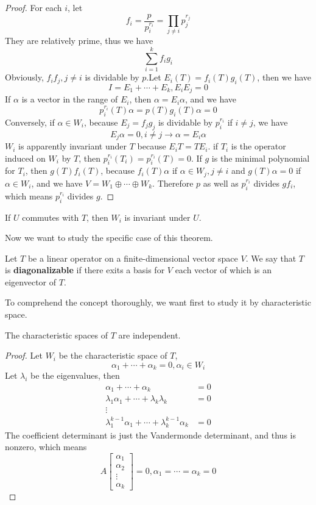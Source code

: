 \documentclass{article}
\begin{document}
\begin{proof}
	For each $i$, let
	\[f_i=\frac{p}{p_i^{r_i}}=\prod_{j\neq i}p_{j}^{r_j}\]
	They are relatively prime, thus we have
	\[\sum\limits_{i=1}^kf_ig_i\]
	Obviously, $f_if_j,j\neq i$ is dividable by $p$.Let $E_i(T)=f_i(T)g_i(T)$, then we have
	\[I=E_1+\cdots+E_k,E_iE_j=0\]
	If $\alpha$ is a vector in the range of $E_i$, then $\alpha=E_i\alpha$, and we have
	\[p_i^{r_i}(T)\alpha=p(T)g_i(T)\alpha=0\]
	Conversely, if $\alpha\in W_i$, because $E_j=f_jg_j$ is dividable by $p_i^{r_i}$ if $i\neq j$, we have
	\[E_j\alpha=0,i\neq j\rightarrow\alpha=E_i\alpha\]
	$W_i$ is apparently invariant under $T$ because $E_iT=TE_i$. if $T_i$ is the operator induced on $W_i$ by $T$, then $p_i^{r_i}(T_i)=p_i^{r_i}(T)=0$. If $g$ is the minimal polynomial for $T_i$, then $g(T)f_i(T)$, because $f_i(T)\alpha$ if $\alpha\in W_j,j\neq i$ and $g(T)\alpha=0$ if $\alpha\in W_i$, and we have $V=W_1\oplus\cdots\oplus W_k$. Therefore $p$ as well as $p_i^{r_i}$ divides $gf_i$, which means $p_i^{r_i}$ divides $g$.
\end{proof}
\begin{coro}
	If $U$ commutes with $T$, then $W_i$ is invariant under $U$.
\end{coro}
Now we want to study the specific case of this theorem.
\begin{dde}
	Let $T$ be a linear operator on a finite-dimensional vector space $V$. We say that $T$ is \textbf{diagonalizable} if there exits a basis for $V$ each vector of which is an eigenvector of $T$.
\end{dde}
To comprehend the concept thoroughly, we want first to study it by characteristic space.
\begin{thm}
	The characteristic spaces of $T$ are independent.
\end{thm}
\begin{proof}
	Let $W_i$ be the characteristic space of $T$,
	\[\alpha_1+\cdots+\alpha_k=0,\alpha_i\in W_i\]
	Let $\lambda_i$ be the eigenvalues, then
	\begin{align*}
		\alpha_1+\cdots+\alpha_k&=0\\
		\lambda_1\alpha_1+\cdots+\lambda_k\lambda_k&=0\\
		\vdots\\
		\lambda_1^{k-1}\alpha_1+\cdots+\lambda_k^{k-1}\alpha_k&=0
	\end{align*}
	The coefficient determinant is just the Vandermonde determinant, and thus is nonzero, which means 
	\[A\begin{bmatrix}
		\alpha_1\\
		\alpha_2\\
		\vdots\\
		\alpha_k
	\end{bmatrix}=0,\alpha_1=\cdots=\alpha_k=0\] 
\end{proof}
\end{document}
